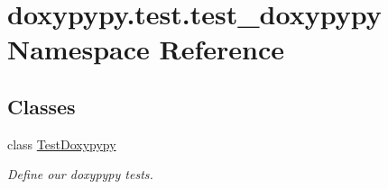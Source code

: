 \hypertarget{namespacedoxypypy_1_1test_1_1test__doxypypy}{\section{doxypypy.\-test.\-test\-\_\-doxypypy Namespace Reference}
\label{namespacedoxypypy_1_1test_1_1test__doxypypy}
}
\subsection*{Classes}
\begin{DoxyCompactItemize}
\item 
class \hyperlink{classdoxypypy_1_1test_1_1test__doxypypy_1_1_test_doxypypy}{Test\-Doxypypy}
\begin{DoxyCompactList}\small\item\em Define our doxypypy tests. \end{DoxyCompactList}\end{DoxyCompactItemize}
